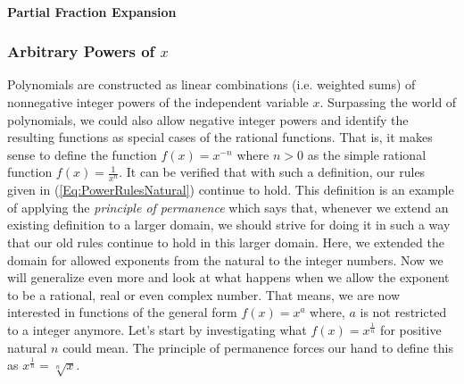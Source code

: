 
\paragraph{Partial Fraction Expansion}




\subsubsection{Arbitrary Powers of $x$}
Polynomials are constructed as linear combinations (i.e. weighted sums) of nonnegative integer powers of the independent variable $x$. Surpassing the world of polynomials, we could also allow negative integer powers and identify the resulting functions as special cases of the rational functions. That is, it makes sense to define the function $f(x) = x^{-n}$ where $n > 0$ as the simple rational function $f(x) = \frac{1}{x^n}$. It can be verified that with such a definition, our rules given in (\ref{Eq:PowerRulesNatural}) continue to hold. This definition is an example of applying the \emph{principle of permanence} which says that, whenever we extend an existing definition to a larger domain, we should strive for doing it in such a way that our old rules continue to hold in this larger domain. Here, we extended the domain for allowed exponents from the natural to the integer numbers. Now we will generalize even more and look at what happens when we allow the exponent to be a rational, real or even complex number. That means, we are now interested in functions of the general form $f(x) = x^a$ where, $a$ is not restricted to a integer anymore. Let's start by investigating what $f(x) = x^{\frac{1}{n}}$ for positive natural $n$ could mean. The principle of permanence forces our hand to define this as $x^{\frac{1}{n}} = \sqrt[n]{x}$.

